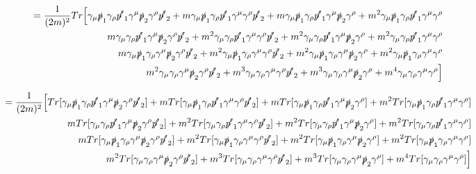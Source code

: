 \documentclass[a4]{article}
\begin{document}
    \begin{eqnarray}
        = \frac{1}{(2 m)^2} Tr \Big[ \gamma_\mu \slashed{p}_1 \gamma_\rho \slashed{p'}_1 \gamma^\mu \slashed{p}_2 \gamma^\rho \slashed{p'}_2 + m \gamma_\mu \slashed{p}_1 \gamma_\rho \slashed{p'}_1 \gamma^\mu \gamma^\rho \slashed{p'}_2 + m \gamma_\mu \slashed{p}_1 \gamma_\rho \slashed{p'}_1 \gamma^\mu \slashed{p}_2 \gamma^\rho + m^2 \gamma_\mu \slashed{p}_1 \gamma_\rho \slashed{p'}_1 \gamma^\mu \gamma^\rho \\
        m \gamma_\mu \gamma_\rho \slashed{p'}_1 \gamma^\mu \slashed{p}_2 \gamma^\rho \slashed{p'}_2 + m^2 \gamma_\mu \gamma_\rho \slashed{p'}_1 \gamma^\mu \gamma^\rho \slashed{p'}_2 + m^2 \gamma_\mu \gamma_\rho \slashed{p'}_1 \gamma^\mu \slashed{p}_2 \gamma^\rho + m^2 \gamma_\mu \gamma_\rho \slashed{p'}_1 \gamma^\mu \gamma^\rho \\
        m \gamma_\mu \slashed{p}_1 \gamma_\rho \gamma^\mu \slashed{p}_2 \gamma^\rho \slashed{p'}_2 + m^2 \gamma_\mu \slashed{p}_1 \gamma_\rho \gamma^\mu \gamma^\rho \slashed{p'}_2 + m^2 \gamma_\mu \slashed{p}_1 \gamma_\rho \gamma^\mu \slashed{p}_2 \gamma^\rho + m^2 \gamma_\mu \slashed{p}_1 \gamma_\rho \gamma^\mu \gamma^\rho \\
        m^2 \gamma_\mu \gamma_\rho \gamma^\mu \slashed{p}_2 \gamma^\rho \slashed{p'}_2 + m^3 \gamma_\mu \gamma_\rho \gamma^\mu \gamma^\rho \slashed{p'}_2 + m^3 \gamma_\mu \gamma_\rho \gamma^\mu \slashed{p}_2 \gamma^\rho + m^4 \gamma_\mu \gamma_\rho \gamma^\mu \gamma^\rho \Big]
    \end{eqnarray}

    \begin{eqnarray}
        = \frac{1}{(2 m)^2} \Big[ Tr[ \gamma_\mu \slashed{p}_1 \gamma_\rho \slashed{p'}_1 \gamma^\mu \slashed{p}_2 \gamma^\rho \slashed{p'}_2] + m Tr[\gamma_\mu \slashed{p}_1 \gamma_\rho \slashed{p'}_1 \gamma^\mu \gamma^\rho \slashed{p'}_2] + m Tr[\gamma_\mu \slashed{p}_1 \gamma_\rho \slashed{p'}_1 \gamma^\mu \slashed{p}_2 \gamma^\rho] + m^2 Tr[\gamma_\mu \slashed{p}_1 \gamma_\rho \slashed{p'}_1 \gamma^\mu \gamma^\rho] \\
        m Tr[\gamma_\mu \gamma_\rho \slashed{p'}_1 \gamma^\mu \slashed{p}_2 \gamma^\rho \slashed{p'}_2] + m^2 Tr[\gamma_\mu \gamma_\rho \slashed{p'}_1 \gamma^\mu \gamma^\rho \slashed{p'}_2] + m^2 Tr[\gamma_\mu \gamma_\rho \slashed{p'}_1 \gamma^\mu \slashed{p}_2 \gamma^\rho] + m^2 Tr[\gamma_\mu \gamma_\rho \slashed{p'}_1 \gamma^\mu \gamma^\rho] \\
        m Tr[\gamma_\mu \slashed{p}_1 \gamma_\rho \gamma^\mu \slashed{p}_2 \gamma^\rho \slashed{p'}_2] + m^2 Tr[\gamma_\mu \slashed{p}_1 \gamma_\rho \gamma^\mu \gamma^\rho \slashed{p'}_2] + m^2 Tr[\gamma_\mu \slashed{p}_1 \gamma_\rho \gamma^\mu \slashed{p}_2 \gamma^\rho] + m^2 Tr[\gamma_\mu \slashed{p}_1 \gamma_\rho \gamma^\mu \gamma^\rho] \\
        m^2 Tr[\gamma_\mu \gamma_\rho \gamma^\mu \slashed{p}_2 \gamma^\rho \slashed{p'}_2] + m^3 Tr[\gamma_\mu \gamma_\rho \gamma^\mu \gamma^\rho \slashed{p'}_2] + m^3 Tr[\gamma_\mu \gamma_\rho \gamma^\mu \slashed{p}_2 \gamma^\rho] + m^4 Tr[\gamma_\mu \gamma_\rho \gamma^\mu \gamma^\rho] \Big]
    \end{eqnarray}
\end{document}
